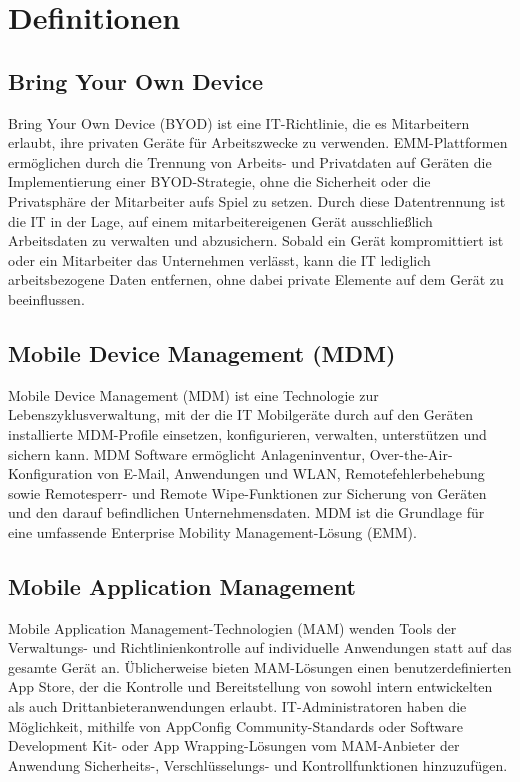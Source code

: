 \chapter{Definitionen}
\label{cha:Definitionen}

\section{Bring Your Own Device}
Bring Your Own Device (BYOD) ist eine IT-Richtlinie, die es Mitarbeitern erlaubt, ihre privaten Geräte für Arbeitszwecke zu verwenden. EMM-Plattformen ermöglichen durch die Trennung von Arbeits- und Privatdaten auf Geräten die Implementierung einer BYOD-Strategie, ohne die Sicherheit oder die Privatsphäre der Mitarbeiter aufs Spiel zu setzen. Durch diese Datentrennung ist die IT in der Lage, auf einem mitarbeitereigenen Gerät ausschließlich Arbeitsdaten zu verwalten und abzusichern. Sobald ein Gerät kompromittiert ist oder ein Mitarbeiter das Unternehmen verlässt, kann die IT lediglich arbeitsbezogene Daten entfernen, ohne dabei private Elemente auf dem Gerät zu beeinflussen. 

\section{Mobile Device Management (MDM)}
Mobile Device Management (MDM) ist eine Technologie zur Lebenszyklusverwaltung, mit der die IT Mobilgeräte durch auf den Geräten installierte MDM-Profile einsetzen, konfigurieren, verwalten, unterstützen und sichern kann. MDM Software ermöglicht Anlageninventur, Over-the-Air-Konfiguration von E-Mail, Anwendungen und WLAN, Remotefehlerbehebung sowie Remotesperr- und Remote Wipe-Funktionen zur Sicherung von Geräten und den darauf befindlichen Unternehmensdaten. MDM ist die Grundlage für eine umfassende Enterprise Mobility Management-Lösung (EMM). 

\section{Mobile Application Management}
Mobile Application Management-Technologien (MAM) wenden Tools der Verwaltungs- und Richtlinienkontrolle auf individuelle Anwendungen statt auf das gesamte Gerät an. Üblicherweise bieten MAM-Lösungen einen benutzerdefinierten App Store, der die Kontrolle und Bereitstellung von sowohl intern entwickelten als auch Drittanbieteranwendungen erlaubt. IT-Administratoren haben die Möglichkeit, mithilfe von AppConfig Community-Standards oder Software Development Kit- oder App Wrapping-Lösungen vom MAM-Anbieter der Anwendung Sicherheits-, Verschlüsselungs- und Kontrollfunktionen hinzuzufügen. 

